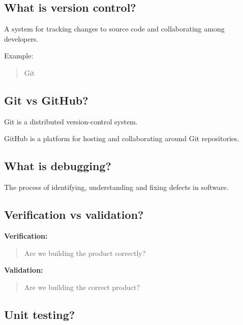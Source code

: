 \medskip

\subsection{What is version control?}

A system for tracking changes to source code and collaborating among developers.

Example:

\begin{quote}
Git\\
\end{quote}

\medskip

\subsection{Git vs GitHub?}

Git is a distributed version-control system.

GitHub is a platform for hosting and collaborating around Git repositories.

\medskip

\subsection{What is debugging?}

The process of identifying, understanding and fixing defects in software.

\medskip

\subsection{Verification vs validation?}

\textbf{Verification:}

\begin{quote}
Are we building the product correctly?\\
\end{quote}

\textbf{Validation:}

\begin{quote}
Are we building the correct product?\\
\end{quote}

\medskip

\subsection{Unit testing?}

